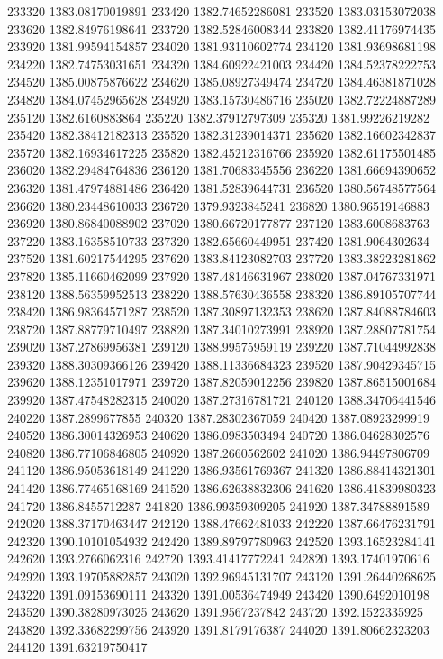 {233320 1383.08170019891
233420 1382.74652286081
233520 1383.03153072038
233620 1382.84976198641
233720 1382.52846008344
233820 1382.41176974435
233920 1381.99594154857
234020 1381.93110602774
234120 1381.93698681198
234220 1382.74753031651
234320 1384.60922421003
234420 1384.52378222753
234520 1385.00875876622
234620 1385.08927349474
234720 1384.46381871028
234820 1384.07452965628
234920 1383.15730486716
235020 1382.72224887289
235120 1382.6160883864
235220 1382.37912797309
235320 1381.99226219282
235420 1382.38412182313
235520 1382.31239014371
235620 1382.16602342837
235720 1382.16934617225
235820 1382.45212316766
235920 1382.61175501485
236020 1382.29484764836
236120 1381.70683345556
236220 1381.66694390652
236320 1381.47974881486
236420 1381.52839644731
236520 1380.56748577564
236620 1380.23448610033
236720 1379.9323845241
236820 1380.96519146883
236920 1380.86840088902
237020 1380.66720177877
237120 1383.6008683763
237220 1383.16358510733
237320 1382.65660449951
237420 1381.9064302634
237520 1381.60217544295
237620 1383.84123082703
237720 1383.38223281862
237820 1385.11660462099
237920 1387.48146631967
238020 1387.04767331971
238120 1388.56359952513
238220 1388.57630436558
238320 1386.89105707744
238420 1386.98364571287
238520 1387.30897132353
238620 1387.84088784603
238720 1387.88779710497
238820 1387.34010273991
238920 1387.28807781754
239020 1387.27869956381
239120 1388.99575959119
239220 1387.71044992838
239320 1388.30309366126
239420 1388.11336684323
239520 1387.90429345715
239620 1388.12351017971
239720 1387.82059012256
239820 1387.86515001684
239920 1387.47548282315
240020 1387.27316781721
240120 1388.34706441546
240220 1387.2899677855
240320 1387.28302367059
240420 1387.08923299919
240520 1386.30014326953
240620 1386.0983503494
240720 1386.04628302576
240820 1386.77106846805
240920 1387.2660562602
241020 1386.94497806709
241120 1386.95053618149
241220 1386.93561769367
241320 1386.88414321301
241420 1386.77465168169
241520 1386.62638832306
241620 1386.41839980323
241720 1386.8455712287
241820 1386.99359309205
241920 1387.34788891589
242020 1388.37170463447
242120 1388.47662481033
242220 1387.66476231791
242320 1390.10101054932
242420 1389.89797780963
242520 1393.16523284141
242620 1393.2766062316
242720 1393.41417772241
242820 1393.17401970616
242920 1393.19705882857
243020 1392.96945131707
243120 1391.26440268625
243220 1391.09153690111
243320 1391.00536474949
243420 1390.6492010198
243520 1390.38280973025
243620 1391.9567237842
243720 1392.1522335925
243820 1392.33682299756
243920 1391.8179176387
244020 1391.80662323203
244120 1391.63219750417
}
